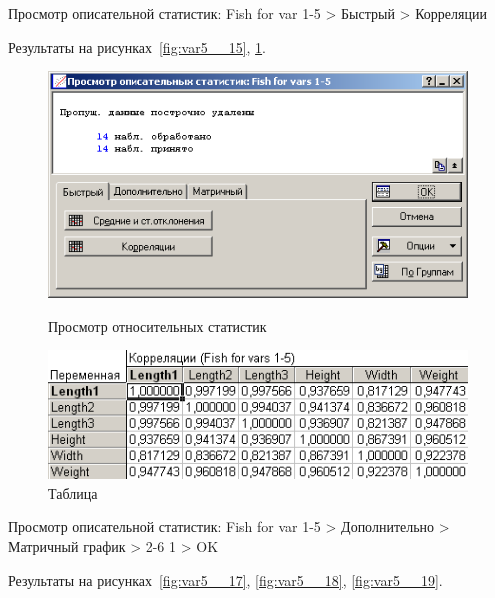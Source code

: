 Просмотр описательной статистик: Fish for var 1-5 > Быстрый > Корреляции

Результаты на рисунках~\ref{fig:var5__15}, \ref{fig:var5__16}.

\begin{figure}[!h]
  \centering
  \begin{minipage}{0.29\textwidth}
    \centering

    \includegraphics[width=0.99\textwidth]
    {inc/var5__15.PNG}

    \caption{Просмотр относительных статистик}
    \label{fig:var5__15}
  \end{minipage}
  \begin{minipage}{0.69\textwidth}
    \centering

    \includegraphics[width=0.99\textwidth]
    {inc/var5__16.PNG}

    \caption{Таблица}
    \label{fig:var5__16}
  \end{minipage}
\end{figure}

Просмотр описательной статистик: Fish for var 1-5 > Дополнительно > Матричный график > 2-6 1 > OK

Результаты на рисунках~\ref{fig:var5__17}, \ref{fig:var5__18}, \ref{fig:var5__19}.

